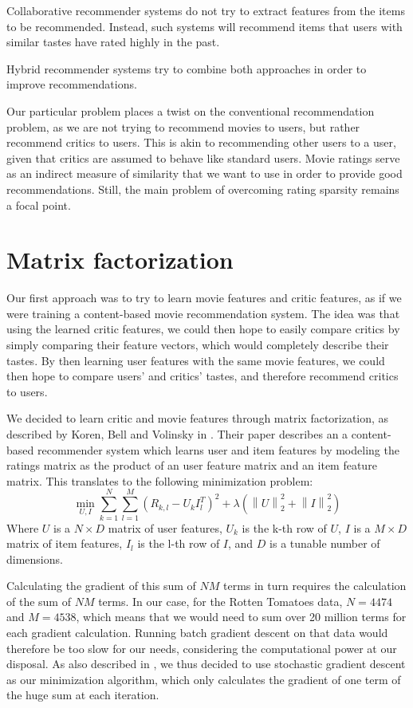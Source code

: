 \documentclass[12pt]{article}
\newcommand{\norm}[1]{\left\lVert#1\right\rVert}
\begin{document}
Collaborative recommender systems do not try to extract features from the items
to be recommended. Instead, such systems will recommend items that users with
similar tastes have rated highly in the past.

Hybrid recommender systems try to combine both approaches in order to improve
recommendations.

Our particular problem places a twist on the conventional recommendation
problem, as we are not trying to recommend movies to users, but rather
recommend critics to users. This is akin to recommending other users
to a user, given that critics are assumed to behave like standard users.
Movie ratings
serve as an indirect measure of similarity that we want to use in order to
provide good recommendations. Still, the main problem of overcoming rating
sparsity remains a focal point.

\section{Matrix factorization}

Our first approach was to try to learn movie features and critic features, as if
we were training a content-based movie recommendation system. The idea was that 
using the learned critic features, we could then hope to easily compare critics 
by simply comparing their feature vectors, which would completely describe 
their tastes. By then learning user features with the same movie features, we 
could then hope to compare users' and critics' tastes, and therefore recommend 
critics to users. 

We decided to learn critic and movie features through matrix factorization, as described by Koren, Bell and Volinsky in \cite{Koren09}. Their paper describes an a content-based recommender system which learns user and item features by modeling the ratings matrix as the product of an user feature matrix and an item feature matrix. This translates to the following minimization problem:
$$ \min_{U,I} \sum_{k = 1}^{N} \sum_{l = 1}^{M} (R_{k,l} - U_k I_l^T)^2 + \lambda (\norm{U}_2^2 + \norm{I}_2^2) $$
Where $U$ is a $N \times D$ matrix of user features, $U_k$ is the k-th row of $U$, $I$ is a $M \times D$ matrix of item features, $I_l$ is the l-th row of $I$, and $D$ is a tunable number of dimensions.

Calculating the gradient of this sum of $NM$ terms in turn requires the calculation of the sum of $NM$ terms. In our case, for the Rotten Tomatoes data, $N = 4474$ and $M = 4538$, which means that we would need to sum over 20 million terms for each gradient calculation. Running batch gradient descent on that data would therefore be too slow for our needs, considering the computational power at our disposal. As also described in \cite{Koren09}, we thus decided to use stochastic gradient descent as our minimization algorithm, which only calculates the gradient of one term of the huge sum at each iteration.
\end{document}
